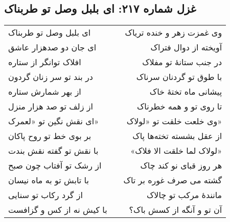 \begin{center}
\section*{غزل شماره ۲۱۷: ای بلبل وصل تو طربناک}
\label{sec:217}
\begin{longtable}{l p{0.5cm} r}
ای بلبل وصل تو طربناک
&&
وی غمزت زهر و خنده تریاک
\\
ای جان دو صدهزار عاشق
&&
آویخته از دوال فتراک
\\
افلاک توانگر از ستاره
&&
در جنب ستانهٔ تو مفلاک
\\
در بند تو سر زنان گردون
&&
با طوق تو گردنان سرناک
\\
از بهر شمارش ستاره
&&
پیشانی ماه تختهٔ خاک
\\
از زلف تو صد هزار منزل
&&
تا روی تو و همه خطرناک
\\
ای نقش نگین تو «لعمرک»
&&
وی خلعت خلقت تو «لولاک»
\\
بر بوی خط تو روح پاکان
&&
از عقل بشسته تخته‌ها پاک
\\
با نقش تو گفته نقش بندت
&&
«لولاک لما خلقت الا فلاک»
\\
از رشک تو آفتاب چون صبح
&&
هر روز قبای نو کند چاک
\\
با تابش تو به ماه نیسان
&&
گشته می صرف غوره بر تاک
\\
از گرد رکاب تو سنایی
&&
مانندهٔ مرکب تو چالاک
\\
با کیش نه از کس و گزافست
&&
آن تو و آنگه از کسش باک؟
\\
\end{longtable}
\end{center}
